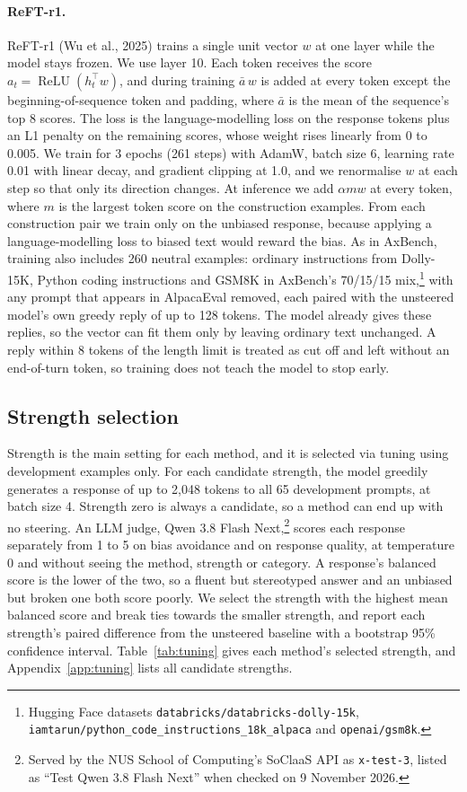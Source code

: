 \documentclass{article}
\begin{document}
\paragraph{ReFT-r1.} ReFT-r1 (Wu et al., 2025) trains a single unit vector $w$ at one layer while the model stays frozen. We use layer 10. Each token receives the score $a_t = \operatorname{ReLU}(h_t^\top w)$, and during training $\bar{a}\,w$ is added at every token except the beginning-of-sequence token and padding, where $\bar{a}$ is the mean of the sequence's top 8 scores. The loss is the language-modelling loss on the response tokens plus an L1 penalty on the remaining scores, whose weight rises linearly from 0 to 0.005. We train for 3 epochs (261 steps) with AdamW, batch size 6, learning rate 0.01 with linear decay, and gradient clipping at 1.0, and we renormalise $w$ at each step so that only its direction changes. At inference we add $\alpha m w$ at every token, where $m$ is the largest token score on the construction examples. From each construction pair we train only on the unbiased response, because applying a language-modelling loss to biased text would reward the bias. As in AxBench, training also includes 260 neutral examples: ordinary instructions from Dolly-15K, Python coding instructions and GSM8K in AxBench's 70/15/15 mix,\footnote{Hugging Face datasets \nolinkurl{databricks/databricks-dolly-15k}, \nolinkurl{iamtarun/python_code_instructions_18k_alpaca} and \nolinkurl{openai/gsm8k}.} with any prompt that appears in AlpacaEval removed, each paired with the unsteered model's own greedy reply of up to 128 tokens. The model already gives these replies, so the vector can fit them only by leaving ordinary text unchanged. A reply within 8 tokens of the length limit is treated as cut off and left without an end-of-turn token, so training does not teach the model to stop early.

\subsection{Strength selection}
\label{sec:strength}

Strength is the main setting for each method, and it is selected via tuning using development examples only. For each candidate strength, the model greedily generates a response of up to 2,048 tokens to all 65 development prompts, at batch size 4. Strength zero is always a candidate, so a method can end up with no steering. An LLM judge, Qwen 3.8 Flash Next,\footnote{Served by the NUS School of Computing's SoClaaS API as \texttt{x-test-3}, listed as ``Test Qwen 3.8 Flash Next'' when checked on 9 November 2026.} scores each response separately from 1 to 5 on bias avoidance and on response quality, at temperature 0 and without seeing the method, strength or category. A response's balanced score is the lower of the two, so a fluent but stereotyped answer and an unbiased but broken one both score poorly. We select the strength with the highest mean balanced score and break ties towards the smaller strength, and report each strength's paired difference from the unsteered baseline with a bootstrap 95\% confidence interval. Table~\ref{tab:tuning} gives each method's selected strength, and Appendix~\ref{app:tuning} lists all candidate strengths.
\end{document}
